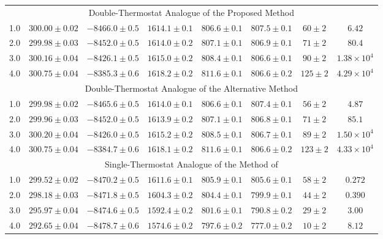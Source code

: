 \documentclass[journal=jctcce,manuscript=article,layout=twocolumn]{achemso}
\begin{document}
\begin{table}
\begin{tabular}{cccccccc}
\hline
\multicolumn{8}{c}{Double-Thermostat Analogue of the Proposed Method} \\
1.0 & $300.00\pm0.02$ & $-8466.0\pm0.5$ & $1614.1\pm0.1$ & $806.6\pm0.1$ & $807.5\pm0.1$ & $60\pm2$ & $6.42$\\
2.0 & $299.98\pm0.03$ & $-8452.0\pm0.5$ & $1614.0\pm0.2$ & $807.1\pm0.1$ & $806.9\pm0.1$ & $71\pm2$ & $80.4$ \\
3.0 & $300.16\pm0.04$ & $-8426.1\pm0.5$ & $1615.0\pm0.2$ & $808.4\pm0.1$ & $806.6\pm0.1$ & $90\pm2$ & $1.38\times10^4$ \\
4.0 & $300.75\pm0.04$ & $-8385.3\pm0.6$ & $1618.2\pm0.2$ & $811.6\pm0.1$ & $806.6\pm0.2$ & $125\pm2$ & $4.29\times10^4$ \\

\hline
\multicolumn{8}{c}{Double-Thermostat Analogue of the Alternative Method} \\
1.0 & $299.98\pm0.02$ & $-8465.6\pm0.5$ & $1614.0\pm0.1$ & $806.6\pm0.1$ & $807.4\pm0.1$ & $56\pm2$ & $4.87$ \\
2.0 & $299.96\pm0.03$ & $-8452.0\pm0.5$ & $1613.9\pm0.2$ & $807.1\pm0.1$ & $806.8\pm0.1$ & $71\pm2$ & $85.1$ \\
3.0 & $300.20\pm0.04$ & $-8426.0\pm0.5$ & $1615.2\pm0.2$ & $808.5\pm0.1$ & $806.7\pm0.1$ & $89\pm2$ & $1.50\times10^4$ \\
4.0 & $300.75\pm0.04$ & $-8384.7\pm0.6$ & $1618.1\pm0.2$ & $811.6\pm0.1$ & $806.6\pm0.2$ & $123\pm2$ & $4.33\times10^4$ \\

\hline
\multicolumn{8}{c}{Single-Thermostat Analogue of the Method of \citeauthor{Kamberaj_2005} \cite{Kamberaj_2005}} \\
1.0 & $299.52\pm0.02$ & $-8470.2\pm0.5$ & $1611.6\pm0.1$ & $805.9\pm0.1$ & $805.6\pm0.1$ & $58\pm2$ & $0.272$ \\
2.0 & $298.18\pm0.03$ & $-8471.8\pm0.5$ & $1604.3\pm0.2$ & $804.4\pm0.1$ & $799.9\pm0.1$ & $44\pm2$ & $0.390$ \\
3.0 & $295.97\pm0.04$ & $-8474.6\pm0.5$ & $1592.4\pm0.2$ & $801.6\pm0.1$ & $790.8\pm0.2$ & $29\pm2$ & $3.00$ \\
4.0 & $292.65\pm0.04$ & $-8478.7\pm0.6$ & $1574.6\pm0.2$ & $797.6\pm0.2$ & $777.0\pm0.2$ & $10\pm2$ & $8.12$ \\

\end{tabular}
\end{table}
\end{document}
